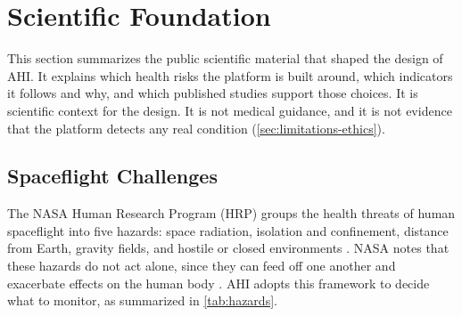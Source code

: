 \section{Scientific Foundation}
\label{sec:scientific-foundation}

This section summarizes the public scientific material that shaped the design of AHI. It explains which health risks the platform is built around, which indicators it follows and why, and which published studies support those choices. It is scientific context for the design. It is not medical guidance, and it is not evidence that the platform detects any real condition (\ref{sec:limitations-ethics}).

\subsection{Spaceflight Challenges}
\label{subsec:spaceflight-challenges}

The NASA Human Research Program (HRP) groups the health threats of human spaceflight into five hazards: space radiation, isolation and confinement, distance from Earth, gravity fields, and hostile or closed environments \cite{nasa_hrp_five_hazards}. NASA notes that these hazards do not act alone, since they can feed off one another and exacerbate effects on the human body \cite{nasa_hrp_five_hazards}. AHI adopts this framework to decide what to monitor, as summarized in \ref{tab:hazards}.

